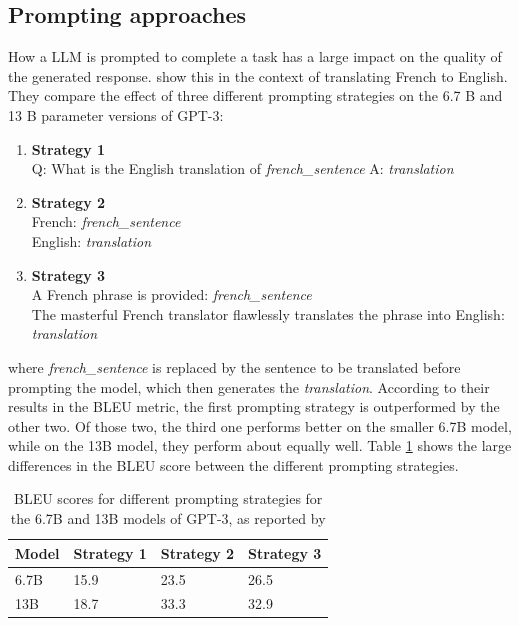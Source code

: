 \subsection{Prompting approaches}\label{sec:prompting-approaches}
How a LLM is prompted to complete a task has a large impact on the quality of the generated response.
\cite{reynolds:2021:Prompt} show this in the context of translating French to English.
They compare the effect of three different prompting strategies on the 6.7 B and 13 B parameter versions of GPT-3:
\begin{enumerate}
    \item \textbf{Strategy 1}\\Q: What is the English translation of \textit{french\_sentence} A: \textit{translation}
    \item \textbf{Strategy 2}\\French: \textit{french\_sentence}\\English: \textit{translation}
    \item \textbf{Strategy 3}\\A French phrase is provided: \textit{french\_sentence}\\
    The masterful French translator flawlessly translates the phrase
into English: \textit{translation}
\end{enumerate}
where \textit{french\_sentence} is replaced by the sentence to be translated before prompting the model, which then generates the \textit{translation}.
According to their results in the BLEU metric, the first prompting strategy is outperformed by the other two.
Of those two, the third one performs better on the smaller 6.7B model, while on the 13B model, they perform  about equally well.
Table \ref{tab:fr-en-prompting} shows the large differences in the BLEU score between the different prompting strategies.
\begin{table}[tb]
\centering
\begin{tabularx}{\textwidth}{lXXX}
\hline
\textbf{Model} & \textbf{Strategy 1} & \textbf{Strategy 2} & \textbf{Strategy 3} \\
\hline
6.7B & 15.9 & 23.5 & 26.5 \\
13B & 18.7 & 33.3 & 32.9 \\
\hline
\end{tabularx}
\caption{BLEU scores for different prompting strategies for the 6.7B and 13B models of GPT-3, as reported by \cite{reynolds:2021:Prompt}}\label{tab:fr-en-prompting}
\end{table}

